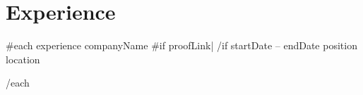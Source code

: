 \section{Experience}
  \resumeSubHeadingListStart

    {{#each experience}}
    \resumeSubheading
      { {{companyName}} {{#if proofLink}}| \href{ {{proofLink}} }{\faLink}{{/if}} }{ {{startDate}} -- {{endDate}} }
      { {{position}} }{ {{location}} }
      \resumeItemListStart
        
    \resumeItemListEnd

    {{/each}}
    
    
  \resumeSubHeadingListEnd
\vspace{-16pt}
